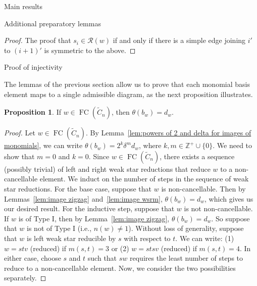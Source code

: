 \documentclass[11pt]{amsart}
\theoremstyle{definition}
\newtheorem{proposition}[theorem]{Proposition}
\numberwithin{equation}{section}
\newcommand{\Z}{\mathbb{Z}}
\newcommand{\C}{\widetilde{C}}
\newcommand{\R}{\mathcal{R}}
\renewcommand{\(}{\left(}
\renewcommand{\)}{\right)}
\DeclareMathOperator{\FC}{FC}
\begin{document}
\begin{section}{Main results}
\begin{subsection}{Additional preparatory lemmas}
\begin{proof}
The proof that $s_{i} \in \R(w)$ if and only if there is a simple edge joining $i'$ to $(i+1)'$ is symmetric to the above.
\end{proof}

\end{subsection}


\begin{subsection}{Proof of injectivity}\label{subsec:injectivity}

The lemmas of the previous section allow us to prove that each monomial basis element maps to a single admissible diagram, as the next proposition illustrates.

\begin{proposition}\label{prop:monomials map to single diagrams}
If $w \in \FC(\C_{n})$, then $\theta(b_{w})=d_{w}$.
\end{proposition}

\begin{proof}
Let $w \in \FC(\C_{n})$.  By Lemma~\ref{lem:powers of 2 and delta for images of monomials}, we can write $\theta(b_{w})=2^{k}\delta^{m}d_{w}$, where $k,m \in \Z^{+}\cup\{0\}$.  We need to show that $m=0$ and $k=0$.  Since $w \in \FC(\C_{n})$, there exists a sequence (possibly trivial) of left and right weak star reductions that reduce $w$ to a non-cancellable element.  We induct on the number of steps in the sequence of weak star reductions.  For the base case, suppose that $w$ is non-cancellable.  Then by Lemmas~\ref{lem:image zigzag} and~\ref{lem:image wsrm}, $\theta(b_{w})=d_{w}$, which gives us our desired result.  For the inductive step, suppose that $w$ is not non-cancellable.  If $w$ is of Type I, then by Lemma~\ref{lem:image zigzag}, $\theta(b_{w})=d_{w}$.  So suppose that $w$ is not of Type I (i.e., $n(w)\neq 1$).  Without loss of generality, suppose that $w$ is left weak star reducible by $s$ with respect to $t$.  We can write: (1) $w=stv$ (reduced) if $m(s,t)=3$ or (2) $w=stsv$ (reduced) if $m(s,t)=4$.  In either case, choose $s$ and $t$ such that $sw$ requires the least number of steps to reduce to a non-cancellable element. Now, we consider the two possibilities separately.


\end{proof}
\end{subsection}
\end{section}
\end{document}
